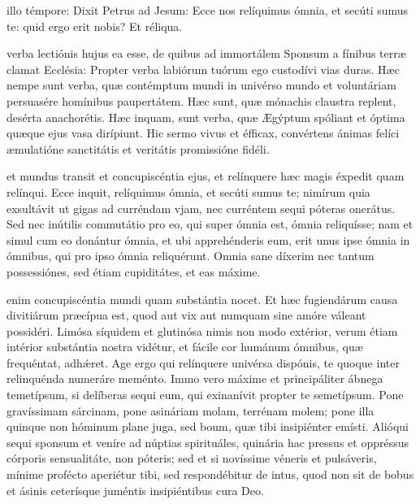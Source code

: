 \documentclass[fontsize=9pt,paper=A6,twoside,BCOR=1mm,DIV=22,headinclude]{scrarticle}
\begin{document}
\begin{multicols}{2}
{\RVCPvi 

 illo témpore: Dixit Petrus ad Jesum: Ecce nos relíquimus ómnia, et secúti sumus te: quid ergo erit nobis? Et réliqua.

 verba lectiónis hujus ea esse, de quibus ad immortálem Sponsum a fínibus terræ clamat Ecclésia: Propter verba labiórum tuórum ego custodívi vias duras. Hæc nempe sunt verba, quæ contémptum mundi in univérso mundo et voluntáriam persuasére homínibus paupertátem. Hæc sunt, quæ mónachis claustra replent, desérta anachorétis. Hæc inquam, sunt verba, quæ Ægýptum spóliant et óptima quæque ejus vasa dirípiunt. Hic sermo vivus et éfficax, convértens ánimas felíci æmulatióne sanctitátis et veritátis promissióne fidéli.

\RVCPvii

 et mundus transit et concupiscéntia ejus, et relínquere hæc magis éxpedit quam relínqui. Ecce inquit, relíquimus ómnia, et secúti sumus te; nimírum quia exsultávit ut gigas ad curréndam vjam, nec curréntem sequi póteras onerátus. Sed nec inútilis commutátio pro eo, qui super ómnia est, ómnia reliquísse; nam et simul cum eo donántur ómnia, et ubi apprehénderis eum, erit unus ipse ómnia in ómnibus, qui pro ipso ómnia reliquérunt. Omnia sane díxerim nec tantum possessiónes, sed étiam cupiditátes, et eas máxime.

\RVCPviii

 enim concupiscéntia mundi quam substántia nocet. Et hæc fugiendárum causa divitiárum præcípua est, quod aut vix aut numquam sine amóre váleant possidéri. Limósa síquidem et glutinósa nimis non modo extérior, verum étiam intérior substántia nostra vidétur, et fácile cor humánum ómnibus, quæ frequéntat, adh\'æret. Age ergo qui relínquere univérsa dispónis, te quoque inter relinquénda numeráre meménto. Immo vero máxime et principáliter ábnega temetípsum, si delíberas sequi eum, qui exinanívit propter te semetípsum. Pone gravíssimam sárcinam, pone asináriam molam, terrénam molem; pone illa quinque non hóminum plane juga, sed boum, quæ tibi insipiénter emísti. Alióqui sequi sponsum et veníre ad núptias spirituáles, quinária hac pressus et oppréssus córporis sensualitáte, non póteris; sed et si novíssime véneris et pulsáveris, mínime profécto aperiétur tibi, sed respondébitur de intus, quod non sit de bobus et ásinis ceterísque juméntis insipiéntibus cura Deo.

}
\end{multicols}
\end{document}
